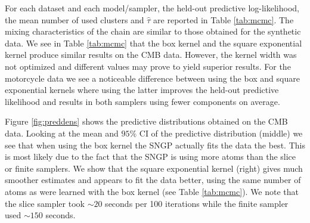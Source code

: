 For each dataset and each model/sampler, the held-out predictive log-likelihood, the mean number of used clusters and 
$\hat{\tau}$ are reported in  Table \ref{tab:mcmc}.  The
mixing characteristics of the chain are similar to those obtained for the
synthetic data.   We see in Table
\ref{tab:mcmc} that the box kernel and the square exponential kernel produce similar results on the CMB data. However, the kernel width was not optimized and different values may prove to yield superior results. For the motorcycle data we see a noticeable difference between using the box and square
exponential kernels where using the latter improves the held-out predictive
likelihood and results in both samplers using fewer components on average.

Figure \ref{fig:preddens} shows the predictive distributions obtained on the CMB data. Looking at the mean and $95\%$ CI of the predictive distribution (middle) we see that when using the box kernel the
SNGP actually fits the data the best.  This is most likely due to the fact that
the SNGP is using more atoms than the slice or finite samplers.  We show that the square exponential kernel (right) gives much smoother estimates and appears to fit the data
better, using the same number of atoms as were learned with the box kernel (see
Table \ref{tab:mcmc}).  We note that the slice sampler took 
$\sim 20$ %
seconds per 100 iterations while the finite sampler used 
$\sim 150$ %
seconds.  





